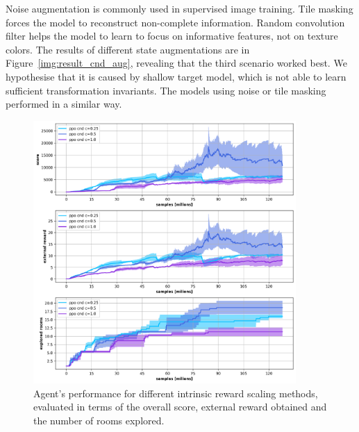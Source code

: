 \documentclass[a4paper,11pt]{elsarticle}
\begin{document}
Noise augmentation is commonly used in supervised image training. Tile masking
forces the model to reconstruct non-complete information. Random convolution filter
helps the model to learn to focus on informative features, not on texture colors. The results of different state augmentations are in Figure~\ref{img:result_cnd_aug}, revealing that the third scenario worked best. We hypothesise that it is caused by shallow target model, which is not able to learn sufficient transformation invariants. The models using noise or tile masking performed in a similar way.


\begin{figure}[t!]
\centering
\includegraphics[width=10cm]{fig/results/aux_experiments/cnd_scaling.png}
\caption{Agent's performance for different intrinsic reward scaling methods, evaluated in terms of the overall score, external reward obtained and the number of rooms explored.}
\label{img:result_cnd_scaling}
\end{figure}
\end{document}
